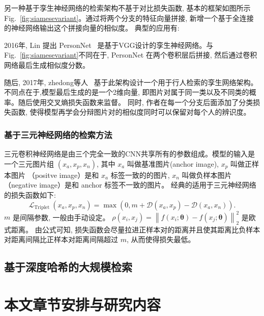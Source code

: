 另一种基于孪生神经网络的检索架构不基于对比损失函数,  基本的框架如图所示Fig.~\ref{fig:siamesevariant}。通过将两个分支的特征向量拼接, 新增一个基于全连接的神经网络输出这个拼接向量的相似度。 典型的应用有:\par
2016年, Lin 提出 PersonNet~\cite{wu2016personnet} 是基于VGG设计的孪生神经网络。与Fig.~\ref{fig:siamesevariant}不同在于, PersonNet 在两个卷积层后拼接, 然后通过卷积网络最后生成相似度分数。 \par
随后, 2017年, zhedong等人~\cite{zheng2017discriminatively} 基于此架构设计一个用于行人检索的孪生网络架构。不同点在于,模型最后生成的是一个2维向量, 即图片对属于同一类以及不同类的概率。随后使用交叉熵损失函数来监督。 同时, 作者在每一个分支后面添加了分类损失函数, 使得模型再学会分辩图片对的相似度同时可以保留对每个人的辨识度。
\subsubsection{基于三元神经网络的检索方法}
三元卷积神经网络是由三个完全一致的CNN共享所有的参数组成。模型的输入是一个三元图片组 $(x_a, x_p, x_n)$, 其中 $x_a$ 叫做基准图片(anchor image), $x_p$ 叫做正样本图片 （positve image）是和 $x_a$ 标签一致的的图片, $x_n$ 叫做负样本图片 （negative image）是和 anchor 标签不一致的图片。 经典的适用于三元神经网络的损失函数如下:
\begin{equation}
    \mathcal{L}_{\text {Triplet }}\left(x_a, x_p, x_n\right)=\max \left(0, m+\mathcal{D}\left(x_a, x_p\right)-\mathcal{D}\left(x_a, x_n\right)\right).
    \label{eq:triplet}
\end{equation}
$m$ 是间隔参数, 一般由手动设定。
$
    \rho\left(x_i, x_j\right)=\left\|f\left(x_i ; \boldsymbol{\theta}\right)-f\left(x_j ; \boldsymbol{\theta}\right)\right\|_2^2
$ 是欧式距离。 由公式可知, 损失函数会尽量拉进正样本对的距离并且使其距离比负样本对距离间隔比正样本对距离间隔超过 $m$, 从而使得损失最低。 \par

\subsection{基于深度哈希的大规模检索}

\section{本文章节安排与研究内容}